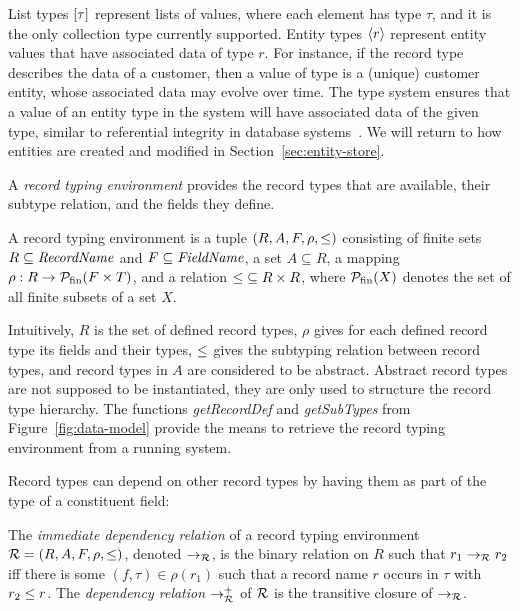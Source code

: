 List types $\left[\tau\right]$ represent lists of values, where each
element has type $\tau$, and it is the only collection type currently
supported. Entity types $\left\langle r\right\rangle$ represent entity values that have
associated data of type $r$. For instance, if the record type
 describes the data of a customer, then a value
of type  is a (unique) customer entity,
whose associated  data may evolve over time. The
type system ensures that a value of an entity type in the system will
have associated data of the given type, similar to referential
integrity in database systems~\cite{bernstein01databases}. We will
return to how entities are created and modified in
Section~\ref{sec:entity-store}.

A \emph{record typing environment} provides the record types that are
available, their subtype relation, and the fields they define.
\begin{definition}%
  A record typing environment is a tuple $(R,A,F,\rho,\le)$
  consisting of finite sets $R \subseteq \mathit{RecordName}$ and $F
  \subseteq \mathit{FieldName}$, a set $A \subseteq R$, a mapping
  $\rho : R\to \mathcal{P}_{\mathrm{fin}}(F \times T)$, and a relation
  ${\le} \subseteq R\times R$, where $\mathcal{P}_{\mathrm{fin}}(X)$ denotes the
  set of all finite subsets of a set $X$.
\end{definition}

Intuitively, $R$ is the set of defined record types, $\rho$ gives for
each defined record type its fields and their types, $\le$ gives
the subtyping relation between record types, and record types in $A$
are considered to be abstract. Abstract record types are not supposed
to be instantiated, they are only used to structure the record type
hierarchy. The functions \emph{getRecordDef} and \emph{getSubTypes}
from Figure~\ref{fig:data-model} provide the means to retrieve the
record typing environment from a running system.

Record types can depend on other record types by having them as part
of the type of a constituent field:
\begin{definition}%
  The \emph{immediate dependency relation} of a record typing
  environment ${\mathcal R}=(R,A,F,\rho,\le)$, denoted $\rightarrow_{\mathcal R}$,
  is the binary relation on $R$ such that $r_1 \rightarrow_{\mathcal R} r_2$ iff
  there is some $(f,\tau) \in \rho(r_1)$ such that a record name $r$
  occurs in $\tau$ with $r_2 \le r$. The \emph{dependency
    relation} $\rightarrow^+_{\mathcal R}$ of ${\mathcal R}$ is the transitive closure
  of $\rightarrow_{\mathcal R}$.
\end{definition}

